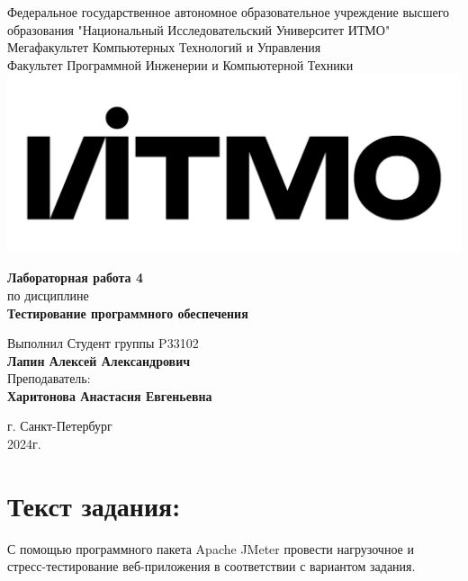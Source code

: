 \documentclass[12pt,onecolumn]{article}
\begin{document}
\setcounter{tocdepth}{4}
\begin{center}
  Федеральное государственное автономное образовательное учреждение высшего образования "Национальный Исследовательский Университет ИТМО"\\
  Мегафакультет Компьютерных Технологий и Управления\\
  Факультет Программной Инженерии и Компьютерной Техники \\
  \includegraphics[scale=0.3]{image/itmo.jpg} %
\end{center}
\vspace{1cm}


\begin{center}
  \textbf{Лабораторная работа 4}\\
  по дисциплине\\
  \textbf{Тестирование программного обеспечения}
\end{center}

\vspace{2cm}

\begin{flushright}
  Выполнил Студент  группы P33102\\
  \textbf{Лапин Алексей Александрович}\\
  Преподаватель: \\
  \textbf{Харитонова Анастасия Евгеньевна}\\
\end{flushright}

\vspace{9cm}
\begin{center}
  г. Санкт-Петербург\\
  2024г.
\end{center}
\pagestyle{empty}
\newpage
\section*{Текст задания:}

С помощью программного пакета Apache JMeter провести нагрузочное и\\ стресс-тестирование веб-приложения в соответствии с вариантом задания.
\end{document}
